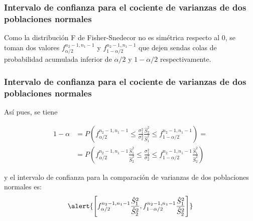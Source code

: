 \begin{frame}
\frametitle{Intervalo de confianza para el cociente de varianzas de dos poblaciones normales}
Como la distribución F de Fisher-Snedecor no es simétrica respecto al 0, se toman dos valores $f^{n_2-1,n_1-1}_{\alpha/2}$ y
$f^{n_2-1,n_1-1}_{1-\alpha/2}$ que dejen sendas colas de probabilidad acumulada inferior de $\alpha/2$ y $1-\alpha/2$ respectivamente.
\begin{center}
\scalebox{0.8}{}
\end{center}
\end{frame}


\begin{frame}
\frametitle{Intervalo de confianza para el cociente de varianzas de dos poblaciones normales}
Así pues, se tiene

\begin{align*}
1-\alpha &= P\left(f^{n_2-1,n_1-1}_{\alpha/2}\leq \frac{\sigma_1^2}{\sigma_2^2}\frac{\hat{S}_2^2}{\hat{S}_1^2}  \leq
f^{n_2-1,n_1-1}_{1-\alpha/2}\right) = \\ &= P\left(f^{n_2-1,n_1-1}_{\alpha/2}\frac{\hat{S}_1^2}{\hat{S}_2^2} \leq
\frac{\sigma_1^2}{\sigma_2^2}  \leq f^{n_2-1,n_1-1}_{1-\alpha/2}\frac{\hat{S}_1^2}{\hat{S}_2^2}\right)
\end{align*}

y el intervalo de confianza para la comparación de varianzas de dos poblaciones normales es:
\[
\alert{\left[f^{n_2-1,n_1-1}_{\alpha/2}\frac{\hat{S}_1^2}{\hat{S}_2^2},f^{n_2-1,n_1-1}_{1-\alpha/2}\frac{\hat{S}_1^2}{\hat{S}_2^2}\right]}
\]
\end{frame}


